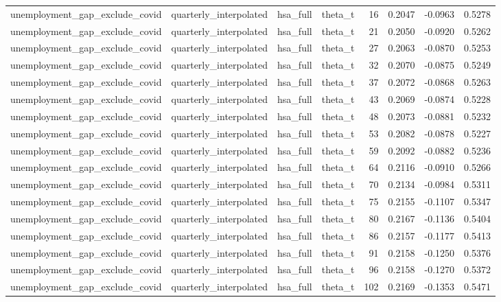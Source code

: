 \begin{tabular}{llllrrrr}
unemployment\_gap\_exclude\_covid & quarterly\_interpolated & hsa\_full & theta\_t & 16 & 0.2047 & -0.0963 & 0.5278 \\
unemployment\_gap\_exclude\_covid & quarterly\_interpolated & hsa\_full & theta\_t & 21 & 0.2050 & -0.0920 & 0.5262 \\
unemployment\_gap\_exclude\_covid & quarterly\_interpolated & hsa\_full & theta\_t & 27 & 0.2063 & -0.0870 & 0.5253 \\
unemployment\_gap\_exclude\_covid & quarterly\_interpolated & hsa\_full & theta\_t & 32 & 0.2070 & -0.0875 & 0.5249 \\
unemployment\_gap\_exclude\_covid & quarterly\_interpolated & hsa\_full & theta\_t & 37 & 0.2072 & -0.0868 & 0.5263 \\
unemployment\_gap\_exclude\_covid & quarterly\_interpolated & hsa\_full & theta\_t & 43 & 0.2069 & -0.0874 & 0.5228 \\
unemployment\_gap\_exclude\_covid & quarterly\_interpolated & hsa\_full & theta\_t & 48 & 0.2073 & -0.0881 & 0.5232 \\
unemployment\_gap\_exclude\_covid & quarterly\_interpolated & hsa\_full & theta\_t & 53 & 0.2082 & -0.0878 & 0.5227 \\
unemployment\_gap\_exclude\_covid & quarterly\_interpolated & hsa\_full & theta\_t & 59 & 0.2092 & -0.0882 & 0.5236 \\
unemployment\_gap\_exclude\_covid & quarterly\_interpolated & hsa\_full & theta\_t & 64 & 0.2116 & -0.0910 & 0.5266 \\
unemployment\_gap\_exclude\_covid & quarterly\_interpolated & hsa\_full & theta\_t & 70 & 0.2134 & -0.0984 & 0.5311 \\
unemployment\_gap\_exclude\_covid & quarterly\_interpolated & hsa\_full & theta\_t & 75 & 0.2155 & -0.1107 & 0.5347 \\
unemployment\_gap\_exclude\_covid & quarterly\_interpolated & hsa\_full & theta\_t & 80 & 0.2167 & -0.1136 & 0.5404 \\
unemployment\_gap\_exclude\_covid & quarterly\_interpolated & hsa\_full & theta\_t & 86 & 0.2157 & -0.1177 & 0.5413 \\
unemployment\_gap\_exclude\_covid & quarterly\_interpolated & hsa\_full & theta\_t & 91 & 0.2158 & -0.1250 & 0.5376 \\
unemployment\_gap\_exclude\_covid & quarterly\_interpolated & hsa\_full & theta\_t & 96 & 0.2158 & -0.1270 & 0.5372 \\
unemployment\_gap\_exclude\_covid & quarterly\_interpolated & hsa\_full & theta\_t & 102 & 0.2169 & -0.1353 & 0.5471 \\

\end{tabular}
